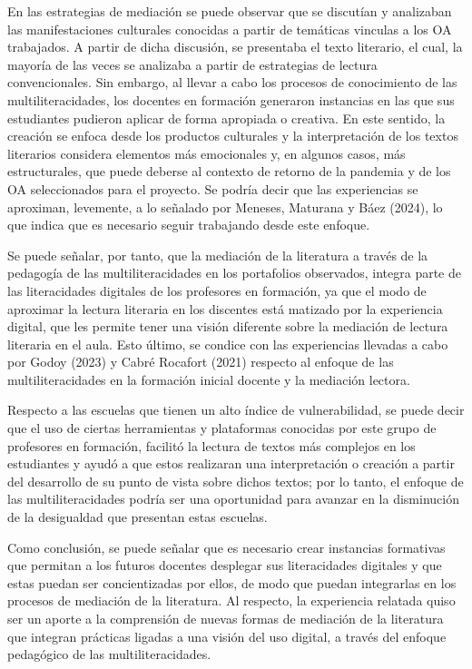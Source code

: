 En las estrategias de mediación se puede observar que se discutían y
analizaban las manifestaciones culturales conocidas a partir de
temáticas vinculas a los OA trabajados. A partir de dicha discusión, se
presentaba el texto literario, el cual, la mayoría de las veces se
analizaba a partir de estrategias de lectura convencionales. Sin
embargo, al llevar a cabo los procesos de conocimiento de las
multiliteracidades, los docentes en formación generaron instancias en
las que sus estudiantes pudieron aplicar de forma apropiada o creativa.
En este sentido, la creación se enfoca desde los productos culturales y
la interpretación de los textos literarios considera elementos más
emocionales y, en algunos casos, más estructurales, que puede deberse al
contexto de retorno de la pandemia y de los OA seleccionados para el
proyecto. Se podría decir que las experiencias se aproximan, levemente,
a lo señalado por Meneses, Maturana y Báez (2024), lo que indica que es
necesario seguir trabajando desde este enfoque.

Se puede señalar, por tanto, que la mediación de la literatura a través
de la pedagogía de las multiliteracidades en los portafolios observados,
integra parte de las literacidades digitales de los profesores en
formación, ya que el modo de aproximar la lectura literaria en los
discentes está matizado por la experiencia digital, que les permite
tener una visión diferente sobre la mediación de lectura literaria en el
aula. Esto último, se condice con las experiencias llevadas a cabo por
Godoy (2023) y Cabré Rocafort (2021) respecto al enfoque de las
multiliteracidades en la formación inicial docente y la mediación
lectora.

Respecto a las escuelas que tienen un alto índice de vulnerabilidad, se
puede decir que el uso de ciertas herramientas y plataformas conocidas
por este grupo de profesores en formación, facilitó la lectura de textos
más complejos en los estudiantes y ayudó a que estos realizaran una
interpretación o creación a partir del desarrollo de su punto de vista
sobre dichos textos; por lo tanto, el enfoque de las multiliteracidades
podría ser una oportunidad para avanzar en la disminución de la
desigualdad que presentan estas escuelas.

Como conclusión, se puede señalar que es necesario crear instancias
formativas que permitan a los futuros docentes desplegar sus
literacidades digitales y que estas puedan ser concientizadas por ellos,
de modo que puedan integrarlas en los procesos de mediación de la
literatura. Al respecto, la experiencia relatada quiso ser un aporte a
la comprensión de nuevas formas de mediación de la literatura que
integran prácticas ligadas a una visión del uso digital, a través del
enfoque pedagógico de las multiliteracidades.

